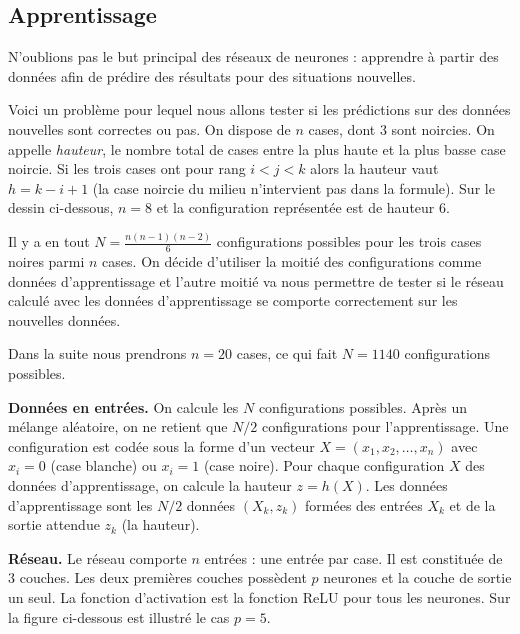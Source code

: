 \documentclass[11pt,class=report,crop=false]{standalone}
\begin{document}
 
\subsection{Apprentissage}

N'oublions pas le but principal des réseaux de neurones : apprendre à partir des données afin de prédire des résultats pour des situations nouvelles.


Voici un problème pour lequel nous allons tester si les prédictions sur des données nouvelles sont correctes ou pas.
On dispose de $n$ cases, dont $3$ sont noircies.  On appelle \emph{hauteur}, le nombre total de cases entre la plus haute et la plus basse case noircie. Si les trois cases ont pour rang $i < j <k$ alors la hauteur vaut $h = k-i+1$ (la case noircie du milieu n'intervient pas dans la formule).
Sur le dessin ci-dessous, $n=8$ et la configuration représentée est de hauteur $6$.


Il y a en tout $N = \frac{n(n-1)(n-2)}{6}$ configurations possibles pour les trois cases noires parmi $n$ cases.
On décide d'utiliser la moitié des configurations comme données d'apprentissage et l'autre moitié va nous permettre de tester si le réseau calculé avec les données d'apprentissage se comporte \og{} correctement\fg{} sur les nouvelles données.

Dans la suite nous prendrons $n=20$ cases, ce qui fait $N=1140$ configurations possibles.

\textbf{Données en entrées.}
On calcule les $N$ configurations possibles. Après un mélange aléatoire, on ne retient que $N/2$ configurations pour l'apprentissage. Une configuration est codée sous la forme d'un vecteur
$X = (x_1,x_2,\ldots,x_n)$ avec $x_i=0$ (case blanche) ou $x_i = 1$ (case noire).
Pour chaque configuration $X$ des données d'apprentissage, on calcule la hauteur $z = h(X)$. Les données d'apprentissage sont les $N/2$ données $(X_k,z_k)$ formées des entrées $X_k$ et de la sortie attendue $z_k$ (la hauteur). 

\textbf{Réseau.}
Le réseau comporte $n$ entrées : une entrée par case. Il est constituée de $3$ couches.
Les deux premières couches possèdent $p$ neurones et la couche de sortie un seul. La fonction d'activation est la fonction ReLU pour tous les neurones. Sur la figure ci-dessous est illustré le cas $p=5$.

\end{document}
